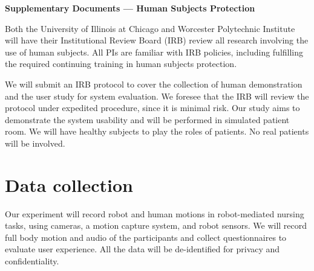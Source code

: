 \pagebreak

\begin{center}
	{\Large \bf Supplementary Documents --- Human Subjects Protection}\\
\end{center}

\vspace{0.5em}

Both the University of Illinois at Chicago and Worcester Polytechnic Institute will have their Institutional Review Board (IRB) review all research involving the use of human subjects. All PIs are familiar with IRB policies, including fulfilling the required continuing training in human subjects protection.

We will submit an IRB protocol to cover the collection of human demonstration and the user study for system evaluation. We foresee that the IRB will review the protocol under expedited procedure, since it is minimal risk. Our study aims to demonstrate the system usability and will be performed in simulated patient room. We will have healthy subjects to play the roles of patients. No real patients will be involved.

\section{Data collection}\label{sec:data}

Our experiment will record robot and human motions in robot-mediated nursing tasks, using cameras, a motion capture system, and robot sensors. We will record full body motion and audio of the participants and collect questionnaires to evaluate user experience. All the data will be de-identified for privacy and confidentiality. 

